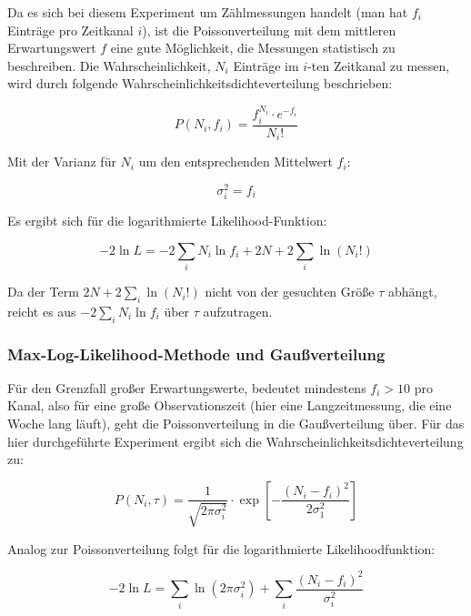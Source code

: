 \documentclass[slug=LM, room=Andreas-Schubert-Bau\,\ K\ 1A, supervisor=Anne-Sophie\ Berthold, coursedate=13.\ 12.\ 2019]{../../Lab_Report_LaTeX/lab_report}
\begin{document}
Da es sich bei diesem Experiment um Zählmessungen handelt (man hat \(f_i\) Einträge pro
Zeitkanal \(i\)), ist die Poissonverteilung mit dem mittleren Erwartungswert \(f\) eine gute 
Möglichkeit, die Messungen statistisch zu  beschreiben. Die Wahrscheinlichkeit, \(N_i\) Einträge 
im \(i\)-ten Zeitkanal zu messen, wird durch folgende Wahrscheinlichkeitsdichteverteilung 
beschrieben:

\begin{equation}\label{eq:poisson}
 P(N_i,f_i) = \frac{f_i^{N_i} \cdot e^{-f_i}}{N_i !}
\end{equation}

Mit der Varianz für \(N_i\) um den entsprechenden Mittelwert \(f_i\):

\begin{equation}\label{key}
 \sigma_i^2 = f_i
\end{equation}

Es ergibt sich für die logarithmierte Likelihood-Funktion:

\begin{equation}\label{key}
 -2\ln L = -2\sum_{i} N_i \ln f_i +2N +2\sum_{i} \ln(N_i!)
\end{equation} 

Da der Term \(2N +2\sum_{i} \ln(N_i!)\) nicht von der gesuchten Größe \(\tau\) abhängt, reicht es
aus \(-2\sum_{i} N_i \ln f_i\) über \(\tau\) aufzutragen.

\subsubsection{Max-Log-Likelihood-Methode und Gaußverteilung}
\label{sec:likegauss}

Für den Grenzfall großer Erwartungswerte, bedeutet mindestens \(f_i > 10\) pro Kanal, also für
eine große Observationszeit (hier eine Langzeitmessung, die eine Woche lang läuft), geht die 
Poissonverteilung in die Gaußverteilung über. Für das hier durchgeführte Experiment ergibt sich
die Wahrscheinlichkeitsdichteverteilung zu:

\begin{equation}\label{eq:wahrgauss}
 P(N_i,\tau) = \frac{1}{\sqrt{2\pi \sigma_i^2}} \cdot \exp[-\frac{(N_i-f_i)^2}{2\sigma_1^2}]
\end{equation}

Analog zur Poissonverteilung folgt für die logarithmierte Likelihoodfunktion:

\begin{equation}\label{key}
 -2\ln L = \sum_{i}\ln (2\pi\sigma_i^2) + \sum_{i} \frac{(N_i - f_i)^2}{\sigma_i^2}
\end{equation}
\end{document}
